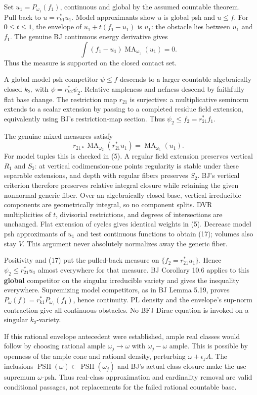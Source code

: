 \documentclass[
  11pt,
]{article}
\begin{document}
Set \(u_1=P_{\omega_1}(f_1)\), continuous and global by the assumed
countable theorem. Pull back to \(u=r_{k1}^*u_1\). Model approximants
show \(u\) is global psh and \(u\leq f\). For \(0\leq t\leq1\), the
envelope of \(u_1+t(f_1-u_1)\) is \(u_1\): the obstacle lies between
\(u_1\) and \(f_1\). The genuine BJ continuous energy derivative gives
\[\int(f_1-u_1)\operatorname{MA}_{\omega_1}(u_1)=0.\tag{16}\] Thus the
measure is supported on the closed contact set.

A global model psh competitor \(\psi\leq f\) descends to a larger
countable algebraically closed \(k_2\), with \(\psi=r_{k2}^*\psi_2\).
Relative ampleness and nefness descend by faithfully flat base change.
The restriction map \(r_{21}\) is surjective: a multiplicative seminorm
extends to a scalar extension by passing to a completed residue field
extension, equivalently using BJ's restriction-map section. Thus
\(\psi_2\leq f_2=r_{21}^*f_1\).

The genuine mixed measures satisfy
\[r_{21*}\operatorname{MA}_{\omega_2}(r_{21}^*u_1)
      =\operatorname{MA}_{\omega_1}(u_1).\tag{17}\] For model tuples
this is checked in (5). A regular field extension preserves vertical
\(R_1\) and \(S_2\): at vertical codimension-one points regularity is
stable under these separable extensions, and depth with regular fibers
preserves \(S_2\). BJ's vertical criterion therefore preserves relative
integral closure while retaining the given nonnormal generic fiber. Over
an algebraically closed base, vertical irreducible components are
geometrically integral, so no component splits. DVR multiplicities of
\(t\), divisorial restrictions, and degrees of intersections are
unchanged. Flat extension of cycles gives identical weights in (5).
Decrease model psh approximants of \(u_1\) and test continuous functions
to obtain (17); volumes also stay \(V\). This argument never absolutely
normalizes away the generic fiber.

Positivity and (17) put the pulled-back measure on
\(\{f_2=r_{21}^*u_1\}\). Hence \(\psi_2\leq r_{21}^*u_1\) almost
everywhere for that measure. BJ Corollary 10.6 applies to this
\textbf{global} competitor on the singular irreducible variety and gives
the inequality everywhere. Supremizing model competitors, as in BJ Lemma
5.19, proves \(P_\omega(f)=r_{k1}^*P_{\omega_1}(f_1)\), hence
continuity. PL density and the envelope's sup-norm contraction give all
continuous obstacles. No BFJ Dirac equation is invoked on a singular
\(k_2\)-variety.

If this rational envelope antecedent were established, ample real
classes would follow by choosing rational ample \(\omega_j\to\omega\)
with \(\omega_j-\omega\) ample. This is possible by openness of the
ample cone and rational density, perturbing \(\omega+\epsilon_j A\). The
inclusions \(\operatorname{PSH}(\omega)\subset
\operatorname{PSH}(\omega_j)\) and BJ's actual class closure make the
usc supremum \(\omega\)-psh. Thus real-class approximation and
cardinality removal are valid conditional passages, not replacements for
the failed rational countable base.
\end{document}
